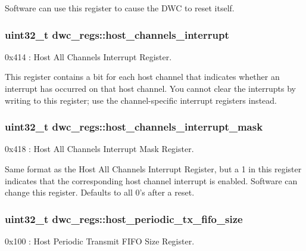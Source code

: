 Software can use this register to cause the D\-W\-C to reset itself. \hypertarget{structdwc__regs_a644ea85e1c69c703b0bf23796476a769}{
\subsubsection[{host\-\_\-channels\-\_\-interrupt}]{\setlength{\rightskip}{0pt plus 5cm}uint32\-\_\-t dwc\-\_\-regs\-::host\-\_\-channels\-\_\-interrupt}}\label{structdwc__regs_a644ea85e1c69c703b0bf23796476a769}
0x414 \-: Host All Channels Interrupt Register.

This register contains a bit for each host channel that indicates whether an interrupt has occurred on that host channel. You cannot clear the interrupts by writing to this register; use the channel-\/specific interrupt registers instead. \hypertarget{structdwc__regs_a8b91feb4d7032ac1a1ebf3da2fd9b260}{
\subsubsection[{host\-\_\-channels\-\_\-interrupt\-\_\-mask}]{\setlength{\rightskip}{0pt plus 5cm}uint32\-\_\-t dwc\-\_\-regs\-::host\-\_\-channels\-\_\-interrupt\-\_\-mask}}\label{structdwc__regs_a8b91feb4d7032ac1a1ebf3da2fd9b260}
0x418 \-: Host All Channels Interrupt Mask Register.

Same format as the Host All Channels Interrupt Register, but a 1 in this register indicates that the corresponding host channel interrupt is enabled. Software can change this register. Defaults to all 0's after a reset. \hypertarget{structdwc__regs_a481970c75328e0debfd7e8285b42b1af}{
\subsubsection[{host\-\_\-periodic\-\_\-tx\-\_\-fifo\-\_\-size}]{\setlength{\rightskip}{0pt plus 5cm}uint32\-\_\-t dwc\-\_\-regs\-::host\-\_\-periodic\-\_\-tx\-\_\-fifo\-\_\-size}}\label{structdwc__regs_a481970c75328e0debfd7e8285b42b1af}
0x100 \-: Host Periodic Transmit F\-I\-F\-O Size Register.

